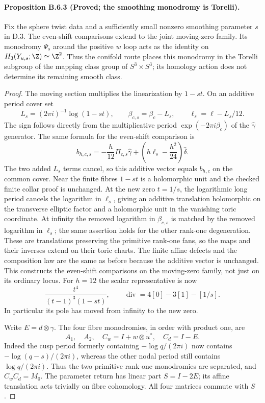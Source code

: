 \paragraph{Proposition B.6.3 (Proved; the smoothing monodromy is Torelli).}
Fix the sphere twist data and a sufficiently small nonzero smoothing
parameter $s$ in D.3. The even-shift comparisons extend to the joint
moving-zero family. Its monodromy $\Psi_s$ around the positive $w$
loop acts as the identity on $H_3(Y_{u,s};\Z)\simeq\Z^2$.
Thus the conifold route places this monodromy in the Torelli subgroup
of the mapping class group of $S^3\times S^3$; its homology action
does not determine its remaining smooth class.
\begin{proof}
The moving section multiplies the linearization by $1-st$. On an
additive period cover set
\[
 L_s=(2\pi i)^{-1}\log(1-st),\qquad
 \beta_{c,s}=\beta_c-L_s,\qquad
 \ell_s=\ell-L_s/12.
\]
The sign follows directly from the multiplicative period
$\exp(-2\pi i\beta_c)$ of the $\widehat\gamma$ generator.
The same formula for the even-shift comparison is
\[
 b_{h,c,s}=-\frac h{12}\Pi_{c,s}\widehat\gamma+
             \left(h\ell_s-\frac{h^2}{24}\right)\widehat\delta.
\]
The two added $L_s$ terms cancel, so this additive vector equals
$b_{h,c}$ on the common cover. Near the finite fibres $1-st$ is a
holomorphic unit and the checked finite collar proof is unchanged.
At the new zero $t=1/s$, the logarithmic long period cancels the
logarithm in $\ell_s$, giving an additive translation holomorphic
on the transverse elliptic factor and a holomorphic unit in the
vanishing toric coordinate. At infinity the removed logarithm in
$\beta_{c,s}$ is matched by the removed logarithm in $\ell_s$;
the same assertion holds for the other rank-one degeneration.
These are translations preserving the primitive rank-one fans, so
the maps and their inverses extend on their toric charts. The finite
affine defects and the composition law are the same as before because
the additive vector is unchanged. This constructs the even-shift
comparisons on the moving-zero family, not just on its ordinary locus.
For $h=12$ the scalar representative is now
\[
 \frac{t^4}{(t-1)^3(1-st)},
 \qquad \operatorname{div}=4[0]-3[1]-[1/s].
 \tag{B.6.1}
\]
In particular its pole has moved from infinity to the new zero.

Write $E=d\otimes\gamma$. The four fibre monodromies, in order
with product one, are
\[
 A_1,\quad A_2,\quad C_w=I+w\otimes u^*,\quad C_d=I-E.
 \tag{B.6.2}
\]
Indeed the cusp period formerly containing $-\log q/(2\pi i)$
now contains $-\log(q-s)/(2\pi i)$, whereas the other nodal period
still contains $\log q/(2\pi i)$. Thus the two primitive rank-one
monodromies are separated, and $C_wC_d=M_0$. The parameter return
has linear part $S=I-2E$; its affine translation acts trivially on
fibre cohomology. All four matrices commute with $S$.


\end{proof}
